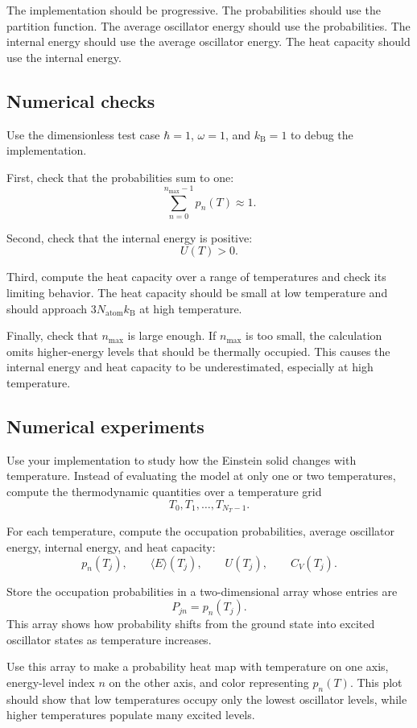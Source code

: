 The implementation should be progressive. The probabilities should use the partition function. The average oscillator energy should use the probabilities. The internal energy should use the average oscillator energy. The heat capacity should use the internal energy.

\subsection{Numerical checks}

Use the dimensionless test case \(\hbar=1\), \(\omega=1\), and \(k_{\mathrm B}=1\) to debug the implementation.

First, check that the probabilities sum to one:
\[
\sum_{n=0}^{n_{\max}-1}p_n(T)\approx1.
\]

Second, check that the internal energy is positive:
\[
U(T)>0.
\]

Third, compute the heat capacity over a range of temperatures and check its limiting behavior. The heat capacity should be small at low temperature and should approach \(3N_{\mathrm{atom}}k_{\mathrm B}\) at high temperature.

Finally, check that \(n_{\max}\) is large enough. If \(n_{\max}\) is too small, the calculation omits higher-energy levels that should be thermally occupied. This causes the internal energy and heat capacity to be underestimated, especially at high temperature.

\subsection{Numerical experiments}

Use your implementation to study how the Einstein solid changes with temperature. Instead of evaluating the model at only one or two temperatures, compute the thermodynamic quantities over a temperature grid
\[
T_0,T_1,\ldots,T_{N_T-1}.
\]

For each temperature, compute the occupation probabilities, average oscillator energy, internal energy, and heat capacity:
\[
p_n(T_j),
\qquad
\langle E\rangle(T_j),
\qquad
U(T_j),
\qquad
C_V(T_j).
\]

Store the occupation probabilities in a two-dimensional array whose entries are
\[
P_{jn}=p_n(T_j).
\]
This array shows how probability shifts from the ground state into excited oscillator states as temperature increases.

Use this array to make a probability heat map with temperature on one axis, energy-level index \(n\) on the other axis, and color representing \(p_n(T)\). This plot should show that low temperatures occupy only the lowest oscillator levels, while higher temperatures populate many excited levels.

